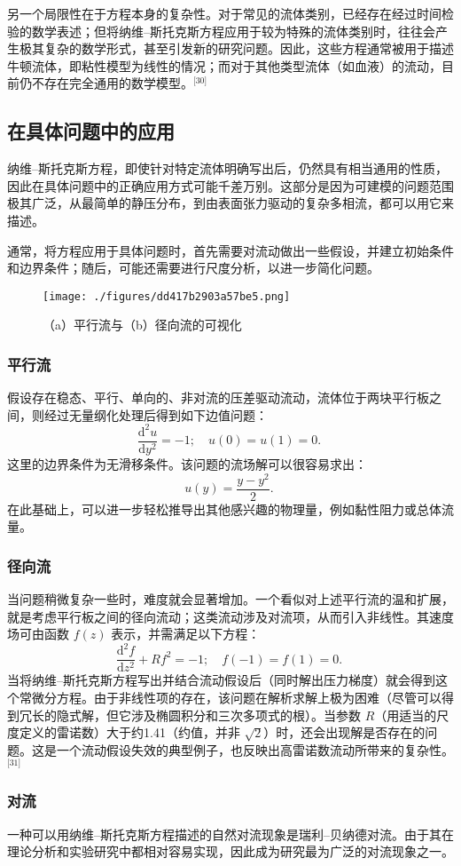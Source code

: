 另一个局限性在于方程本身的复杂性。对于常见的流体类别，已经存在经过时间检验的数学表述；但将纳维–斯托克斯方程应用于较为特殊的流体类别时，往往会产生极其复杂的数学形式，甚至引发新的研究问题。因此，这些方程通常被用于描述牛顿流体，即粘性模型为线性的情况；而对于其他类型流体（如血液）的流动，目前仍不存在完全通用的数学模型。\(^\text{[30]}\)
\subsection{在具体问题中的应用}
纳维–斯托克斯方程，即使针对特定流体明确写出后，仍然具有相当通用的性质，因此在具体问题中的正确应用方式可能千差万别。这部分是因为可建模的问题范围极其广泛，从最简单的静压分布，到由表面张力驱动的复杂多相流，都可以用它来描述。

通常，将方程应用于具体问题时，首先需要对流动做出一些假设，并建立初始条件和边界条件；随后，可能还需要进行尺度分析，以进一步简化问题。
\begin{figure}[ht]
\centering
\texttt{[image: ./figures/dd417b2903a57be5.png]}
\caption{（a）平行流与（b）径向流的可视化} \label{fig_NWstks_3}
\end{figure}
\subsubsection{平行流}
假设存在稳态、平行、单向的、非对流的压差驱动流动，流体位于两块平行板之间，则经过无量纲化处理后得到如下边值问题：
$$
\frac{\mathrm{d}^2 u}{\mathrm{d} y^2} = -1; 
\quad u(0) = u(1) = 0.~
$$
这里的边界条件为无滑移条件。该问题的流场解可以很容易求出：
$$
u(y) = \frac{y - y^2}{2}.~
$$
在此基础上，可以进一步轻松推导出其他感兴趣的物理量，例如黏性阻力或总体流量。
\subsubsection{径向流}
当问题稍微复杂一些时，难度就会显著增加。一个看似对上述平行流的温和扩展，就是考虑平行板之间的径向流动；这类流动涉及对流项，从而引入非线性。其速度场可由函数 $f(z)$ 表示，并需满足以下方程：
$$
\frac{\mathrm{d}^2 f}{\mathrm{d} z^2} + R f^2 = -1; 
\quad f(-1) = f(1) = 0.~
$$
当将纳维–斯托克斯方程写出并结合流动假设后（同时解出压力梯度）就会得到这个常微分方程。由于非线性项的存在，该问题在解析求解上极为困难（尽管可以得到冗长的隐式解，但它涉及椭圆积分和三次多项式的根）。当参数 $R$（用适当的尺度定义的雷诺数）大于约1.41（约值，并非 $\sqrt{2}$）时，还会出现解是否存在的问题。这是一个流动假设失效的典型例子，也反映出高雷诺数流动所带来的复杂性。\(^\text{[31]}\)
\subsubsection{对流}
一种可以用纳维–斯托克斯方程描述的自然对流现象是瑞利–贝纳德对流。由于其在理论分析和实验研究中都相对容易实现，因此成为研究最为广泛的对流现象之一。
